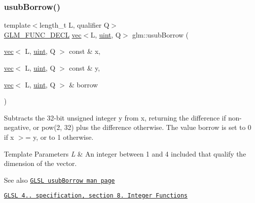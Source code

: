 \subsubsection{\texorpdfstring{usub\+Borrow()}{usubBorrow()}}
{\footnotesize\ttfamily template$<$length\+\_\+t L, qualifier Q$>$ \\
\mbox{\hyperlink{setup_8hpp_ab2d052de21a70539923e9bcbf6e83a51}{G\+L\+M\+\_\+\+F\+U\+N\+C\+\_\+\+D\+E\+CL}} \mbox{\hyperlink{structglm_1_1vec}{vec}}$<$L, \mbox{\hyperlink{group__core__precision_ga4fd29415871152bfb5abd588334147c8}{uint}}, Q$>$ glm\+::usub\+Borrow (\begin{DoxyParamCaption}\item[{\mbox{\hyperlink{structglm_1_1vec}{vec}}$<$ L, \mbox{\hyperlink{group__core__precision_ga4fd29415871152bfb5abd588334147c8}{uint}}, Q $>$ const \&}]{x,  }\item[{\mbox{\hyperlink{structglm_1_1vec}{vec}}$<$ L, \mbox{\hyperlink{group__core__precision_ga4fd29415871152bfb5abd588334147c8}{uint}}, Q $>$ const \&}]{y,  }\item[{\mbox{\hyperlink{structglm_1_1vec}{vec}}$<$ L, \mbox{\hyperlink{group__core__precision_ga4fd29415871152bfb5abd588334147c8}{uint}}, Q $>$ \&}]{borrow }\end{DoxyParamCaption})}

Subtracts the 32-\/bit unsigned integer y from x, returning the difference if non-\/negative, or pow(2, 32) plus the difference otherwise. The value borrow is set to 0 if x $>$= y, or to 1 otherwise.


\begin{DoxyTemplParams}{Template Parameters}
{\em L} & An integer between 1 and 4 included that qualify the dimension of the vector.\\
\hline
\end{DoxyTemplParams}
\begin{DoxySeeAlso}{See also}
\href{http://www.opengl.org/sdk/docs/manglsl/xhtml/usubBorrow.xml}{\tt G\+L\+SL usub\+Borrow man page} 

\href{http://www.opengl.org/registry/doc/GLSLangSpec.4.20.8.pdf}{\tt G\+L\+SL 4.. specification, section 8. Integer Functions} 
\end{DoxySeeAlso}
